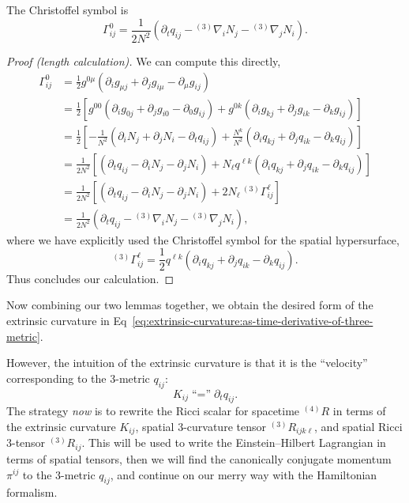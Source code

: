 \begin{lemma}
  The Christoffel symbol is
  \begin{equation}
\Gamma^{0}_{ij} = \frac{1}{2N^{2}}(\partial_{t}q_{ij} - {{}^{(3)}}\nabla_{i}N_{j} - {{}^{(3)}}\nabla_{j}N_{i}).
  \end{equation}
\end{lemma}
\begin{proof}[Proof (length calculation)]
  We can compute this directly,
  \begin{subequations}
    \begin{align}
\Gamma^{0}_{ij} &= \frac{1}{2} g^{0\mu}(\partial_{i}g_{\mu j} + \partial_{j}g_{i\mu} - \partial_{\mu} g_{ij}) \\
        &= \frac{1}{2}\left[ g^{00}(\partial_{i}g_{0j} + \partial_{j}g_{i0} - \partial_{0} g_{ij}) + g^{0k}(\partial_{i}g_{kj} + \partial_{j}g_{ik} - \partial_{k} g_{ij})  \right] \\
        &= \frac{1}{2}\left[ -\frac{1}{N^{2}} (\partial_{i}N_{j}+ \partial_{j}N_{i}- \partial_{t} q_{ij}) + \frac{N^{k}}{N^{2}} (\partial_{i}q_{kj} + \partial_{j}q_{ik} - \partial_{k} q_{ij}) \right] \\
        &= \frac{1}{2N^{2}}\left[ (\partial_{t} q_{ij} - \partial_{i}N_{j}- \partial_{j}N_{i}) + N_{\ell} q^{\ell k} (\partial_{i}q_{kj} + \partial_{j}q_{ik} - \partial_{k} q_{ij}) \right] \\
        &= \frac{1}{2N^{2}}\left[ (\partial_{t} q_{ij} - \partial_{i} N_{j} - \partial_{j}N_{i}) + 2 N_{\ell} \,{{}^{(3)}}\Gamma^{\ell}_{ij} \right] \\
        &= \frac{1}{2N^{2}} \left(\partial_{t} q_{ij} - {{}^{(3)}\nabla}_{i}N_{j}- {{}^{(3)}\nabla}_{j}N_{i}\right),
    \end{align}
  \end{subequations}
  where we have explicitly used the Christoffel symbol for the spatial hypersurface,
  \begin{equation}
    {{}^{(3)}}\Gamma^{\ell}_{ij} = \frac{1}{2}q^{\ell k}(\partial_{i}q_{kj} + \partial_{j}q_{ik} - \partial_{k}q_{ij}).
  \end{equation}
  Thus concludes our calculation.
\end{proof}

Now combining our two lemmas together, we obtain the desired form of the
extrinsic curvature in Eq~\eqref{eq:extrinsic-curvature:as-time-derivative-of-three-metric}.

However, the intuition of the extrinsic curvature is that it is the
``velocity'' corresponding to the 3-metric $q_{ij}$:
\begin{equation}
\boxed{K_{ij}\mathrel{\mbox{``=''}}\partial_{t}q_{ij}.}
\end{equation}
The strategy
\emph{now} is to rewrite the Ricci scalar for spacetime ${}^{(4)}R$ in
terms of the extrinsic curvature $K_{ij}$, spatial 3-curvature tensor
${}^{(3)}R_{ijk\ell}$, and spatial Ricci 3-tensor ${}^{(3)}R_{ij}$. This
will be used to write the Einstein--Hilbert Lagrangian in terms of
spatial tensors, then we will find the canonically conjugate momentum
$\pi^{ij}$ to the 3-metric $q_{ij}$, and continue on our merry way with
the Hamiltonian formalism.
